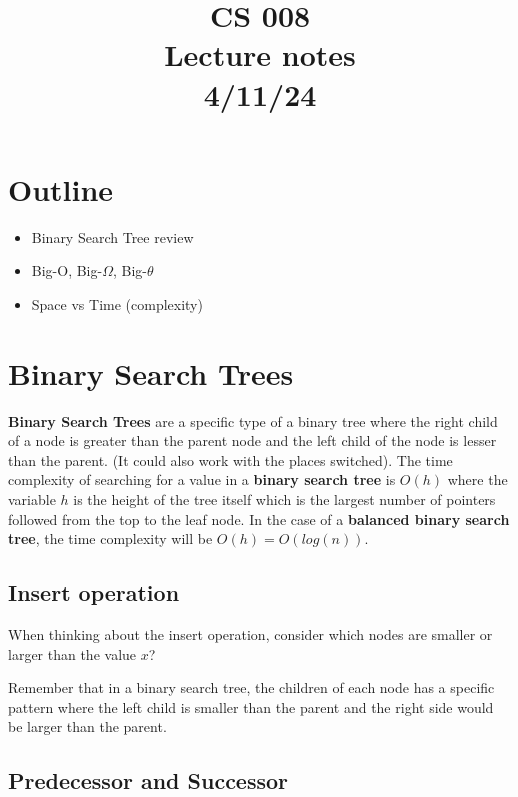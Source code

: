 \documentclass[11pt,a4paper,english]{paper}
\begin{document}
\title{CS 008 \\ Lecture notes \\ 4/11/24}
\maketitle

\section{Outline}

\begin{itemize}

  \item Binary Search Tree review
  \item Big-O, Big-$\Omega$, Big-$\theta$
  \item Space vs Time (complexity)


\end{itemize}

\section{Binary Search Trees}

\textbf{Binary Search Trees} are a specific type of a binary tree where the right child of a node is greater than the parent node and the left child of the node is lesser than the parent. (It could also work with the places switched). The time complexity of searching for a value in a \textbf{binary search tree} is $O(h)$ where the variable $h$ is the height of the tree itself which is the largest number of pointers followed from the top to the leaf node. In the case of a \textbf{balanced binary search tree}, the time complexity will be $O(h) = O(log(n))$.

\subsection{Insert operation}

When thinking about the insert operation, consider which nodes are smaller or larger than the value $x$?
\bigskip

Remember that in a binary search tree, the children of each node has a specific pattern where the left child is smaller than the parent and the right side would be larger than the parent.

\subsection{Predecessor and Successor}
\end{document}
